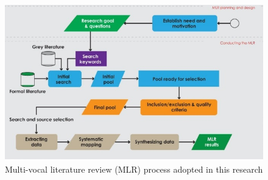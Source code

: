 \documentclass[manuscript]{acmart}
\begin{document}
\begin{figure}
  \includegraphics[width=\textwidth]{MLRprocess.jpg}
  \caption{Multi-vocal literature review (MLR) process adopted in this research ~\cite{SALTAN2021106510}}
  \Description{}
 \label{fig:MLRprocess}
\end{figure}
\end{document}
